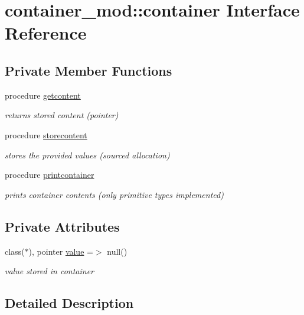 \hypertarget{structcontainer__mod_1_1container}{}\section{container\+\_\+mod\+:\+:container Interface Reference}
\label{structcontainer__mod_1_1container}
\subsection*{Private Member Functions}
\begin{DoxyCompactItemize}
\item 
procedure \hyperlink{structcontainer__mod_1_1container_abe1540dea98e715a935b91c662a2d81a}{getcontent}
\begin{DoxyCompactList}\small\item\em returns stored content (pointer) \end{DoxyCompactList}\item 
procedure \hyperlink{structcontainer__mod_1_1container_a15e46e6f457bb49604ccf191780f6638}{storecontent}
\begin{DoxyCompactList}\small\item\em stores the provided values (sourced allocation) \end{DoxyCompactList}\item 
procedure \hyperlink{structcontainer__mod_1_1container_ac62ed00e4c79b7c758a5efbc9cc1909a}{printcontainer}
\begin{DoxyCompactList}\small\item\em prints container contents (only primitive types implemented) \end{DoxyCompactList}\end{DoxyCompactItemize}
\subsection*{Private Attributes}
\begin{DoxyCompactItemize}
\item 
class($\ast$), pointer \hyperlink{structcontainer__mod_1_1container_a297f4632156bf226aa8599a7f0cd55c0}{value} =$>$ null()
\begin{DoxyCompactList}\small\item\em value stored in container \end{DoxyCompactList}\end{DoxyCompactItemize}


\subsection{Detailed Description}


